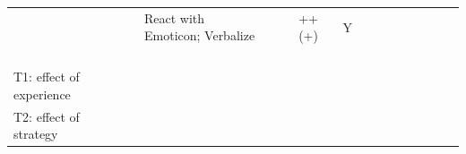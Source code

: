 \documentclass[man]{apa7}
\begin{document}
\begin{landscape}
\begin{table}[]
\begin{tabular}{llllllllllllllll}
                                                         &                                                            &                                          & React with Emoticon; Verbalize                        &                                                        &             & ++ (+)      & Y                               &  &  &  &  &  &  &  &  \\
                                                         &                                                            &                                          &                                                       &                                                        &             &             &                                 &  &  &  &  &  &  &  &  \\
                                                         &                                                            &                                          &                                                       &                                                        &             &             &                                 &  &  &  &  &  &  &  &  \\
                                                         &                                                            &                                          &                                                       &                                                        &             &             &                                 &  &  &  &  &  &  &  &  \\
                                                         &                                                            &                                          &                                                       &                                                        &             &             &                                 &  &  &  &  &  &  &  &  \\
T1: effect of experience                                 &                                                            &                                          &                                                       &                                                        &             &             &                                 &  &  &  &  &  &  &  &  \\
T2: effect of strategy                                   &                                                            &                                          &                                                       &                                                        &             &             &                                 &  &  &  &  &  &  &  & 
\end{tabular}
\end{table}
\end{landscape}
\end{document}
